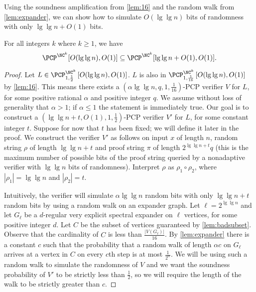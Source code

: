 \documentclass{article}
\newcommand{\PCPcs}[5]{\PCP^{#1}_{#2, #3}\left[#4, #5\right]}
\begin{document}
Using the soundness amplification from \autoref{lem:16} and the random walk from \autoref{lem:expander}, we can show how to simulate $O(\lg \lg n)$ bits of randomness with only $\lg \lg n + O(1)$ bits.

\begin{lemma}[{\cite[Lemma~4]{fs96}}]\label{lem:derandomize}
  For all integers $k$ where $k \geq 1$, we have
  \begin{equation*}
    \PCP^{\NC^k}[O(\lg \lg n), O(1)]
    \subseteq
    \PCP^{\NC^k}[\lg \lg n + O(1), O(1)].
  \end{equation*}
\end{lemma}
\begin{proof}
  Let $L \in \PCPcs{\NC^k}{1}{\frac{1}{2}}{O(\lg \lg n)}{O(1)}$.
  $L$ is also in $\PCPcs{\NC^k}{1}{\frac{1}{16}}{O(\lg \lg n)}{O(1)}$ by \autoref{lem:16}.
  This means there exists a $(\alpha \lg \lg n, q, 1, \frac{1}{16})$-PCP verifier $V$ for $L$, for some positive rational $\alpha$ and positive integer $q$.
  We assume without loss of generality that $\alpha > 1$; if $\alpha \leq 1$ the statement is immediately true.
  Our goal is to construct a $(\lg \lg n + t, O(1), 1, \frac{1}{2})$-PCP verifier $V'$ for $L$, for some constant integer $t$.
  Suppose for now that $t$ has been fixed; we will define it later in the proof.
  We construct the verifier $V'$ as follows on input $x$ of length $n$, random string $\rho$ of length $\lg \lg n + t$ and proof string $\pi$ of length $2^{\lg \lg n + t} q$ (this is the maximum number of possible bits of the proof string queried by a nonadaptive verifier with $\lg \lg n$ bits of randomness).
  Interpret $\rho$ as $\rho_1 \circ \rho_2$, where $|\rho_1| = \lg \lg n$ and $|\rho_2| = t$.

  Intuitively, the verifier will simulate $\alpha \lg \lg n$ random bits with only $\lg \lg n + t$ random bits by using a random walk on an expander graph.
  Let $\ell = 2^{\lg \lg n}$ and let $G_\ell$ be a $d$-regular very explicit spectral expander on $\ell$ vertices, for some positive integer $d$.
  Let $C$ be the subset of vertices guaranteed by \autoref{lem:badsubset}.
  Observe that the cardinality of $C$ is less than $\frac{|V(G_\ell)|}{16}$.
  By \autoref{lem:expander} there is a constant $c$ such that the probability that a random walk of length $\alpha c$ on $G_\ell$ arrives at a vertex in $C$ on every $c$th step is at most $\frac{1}{2^\alpha}$.
  We will be using such a random walk to simulate the randomness of $V$ and we want the soundness probability of $V'$ to be strictly less than $\frac{1}{2}$, so we will require the length of the walk to be strictly greater than $c$.


\end{proof}
\end{document}
